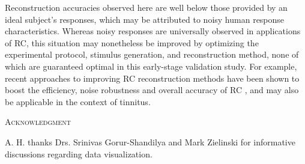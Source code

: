 \documentclass[journal]{IEEEtran}
\begin{document}
Reconstruction accuracies observed here are well below those provided by an ideal subject's responses,
which may be attributed to noisy human response characteristics.
Whereas noisy responses are universally observed in applications of RC,
this situation may nonetheless be improved by optimizing the experimental protocol, stimulus generation, and reconstruction method,
none of which are guaranteed optimal in this early-stage validation study.
For example, recent approaches to improving RC reconstruction methods have been shown to boost the efficiency, noise robustness and overall accuracy of RC
\cite{roopCompressiveSensingApproach2021,comptonStimulusWhiteningImproves2022a},
and may also be applicable in the context of tinnitus.

\vspace{18pt}
\textsc{Acknowledgment}
\par A. H. thanks Drs. Srinivas Gorur-Shandilya and Mark Zielinski for informative discussions regarding data visualization.



\end{document}
